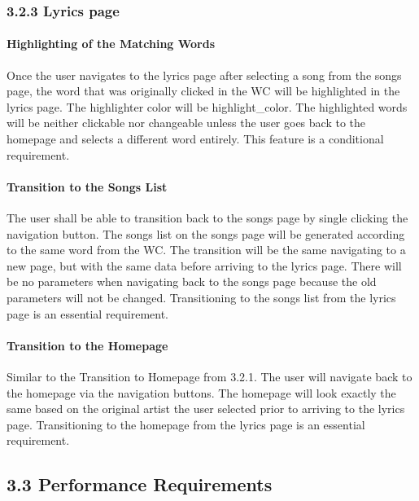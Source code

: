 \documentclass[]{article}
\begin{document}
\subsubsection{3.2.3 Lyrics page}\label{lyrics-page}

\paragraph{Highlighting of the Matching
Words}\label{highlighting-of-the-matching-words}

Once the user navigates to the lyrics page after selecting a song from
the songs page, the word that was originally clicked in the WC will be
highlighted in the lyrics page. The highlighter color will be
highlight\_color. The highlighted words will be neither clickable nor
changeable unless the user goes back to the homepage and selects a
different word entirely. This feature is a conditional requirement.

\paragraph{Transition to the Songs
List}\label{transition-to-the-songs-list-1}

The user shall be able to transition back to the songs page by single
clicking the navigation button. The songs list on the songs page will be
generated according to the same word from the WC. The transition will be
the same navigating to a new page, but with the same data before
arriving to the lyrics page. There will be no parameters when navigating
back to the songs page because the old parameters will not be changed.
Transitioning to the songs list from the lyrics page is an essential
requirement.

\paragraph{Transition to the
Homepage}\label{transition-to-the-homepage-1}

Similar to the Transition to Homepage from 3.2.1. The user will navigate
back to the homepage via the navigation buttons. The homepage will look
exactly the same based on the original artist the user selected prior to
arriving to the lyrics page. Transitioning to the homepage from the
lyrics page is an essential requirement.

\subsection{3.3 Performance
Requirements}\label{performance-requirements}
\end{document}
